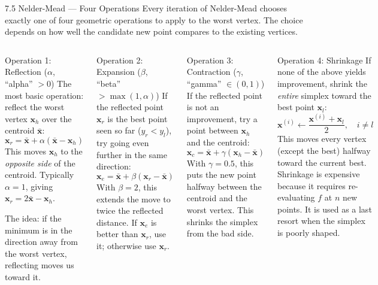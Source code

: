 \documentclass[aspectratio=169,10pt]{beamer}
\begin{document}
\begin{frame}[allowframebreaks]{7.5 Nelder-Mead --- Four Operations}
  Every iteration of Nelder-Mead chooses exactly one of four
  geometric operations to apply to the worst vertex.  The choice
  depends on how well the candidate new point compares to the
  existing vertices.

  \begin{columns}[T]
      \begin{block}{Operation 1: Reflection ($\alpha$, ``alpha'' $> 0$)}
        The most basic operation: reflect the worst vertex
        $\mathbf{x}_h$ over the centroid $\bar{\mathbf{x}}$:
        \[
          \mathbf{x}_r = \bar{\mathbf{x}} + \alpha(\bar{\mathbf{x}} - \mathbf{x}_h)
        \]
        This moves $\mathbf{x}_h$ to the \emph{opposite side} of the
        centroid.  Typically $\alpha = 1$, giving $\mathbf{x}_r =
        2\bar{\mathbf{x}} - \mathbf{x}_h$.

        The idea: if the minimum is in the direction away from the
        worst vertex, reflecting moves us toward it.
      \end{block}

      \begin{block}{Operation 2: Expansion ($\beta$, ``beta'' $> \max(1,\alpha)$)}
        If the reflected point $\mathbf{x}_r$ is the best point seen
        so far ($y_r < y_l$), try going even further in the same
        direction:
        \[
          \mathbf{x}_e = \bar{\mathbf{x}} + \beta(\mathbf{x}_r - \bar{\mathbf{x}})
        \]
        With $\beta = 2$, this extends the move to twice the
        reflected distance.  If $\mathbf{x}_e$ is better than
        $\mathbf{x}_r$, use it; otherwise use $\mathbf{x}_r$.
      \end{block}

      \begin{block}{Operation 3: Contraction ($\gamma$, ``gamma'' $\in (0,1)$)}
        If the reflected point is not an improvement, try a point
        between $\mathbf{x}_h$ and the centroid:
        \[
          \mathbf{x}_c = \bar{\mathbf{x}} + \gamma(\mathbf{x}_h - \bar{\mathbf{x}})
        \]
        With $\gamma = 0.5$, this puts the new point halfway between
        the centroid and the worst vertex.  This shrinks the simplex
        from the bad side.
      \end{block}
      \begin{block}{Operation 4: Shrinkage}
        If none of the above yields improvement, shrink the
        \emph{entire} simplex toward the best point $\mathbf{x}_l$:
        \[
          \mathbf{x}^{(i)} \leftarrow
          \frac{\mathbf{x}^{(i)} + \mathbf{x}_l}{2}, \quad i \ne l
        \]
        This moves every vertex (except the best) halfway toward the
        current best.  Shrinkage is expensive because it requires
        re-evaluating $f$ at $n$ new points.  It is used as a last
        resort when the simplex is poorly shaped.
      \end{block}


\end{columns}
\end{frame}
\end{document}

